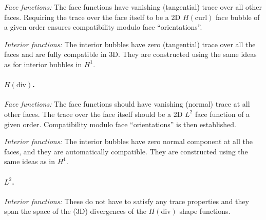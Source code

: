 \textit{Face functions:}
The face functions have vanishing (tangential) trace over all other faces.
Requiring the trace over the face itself to be a 2D $H(\mathrm{curl})$ face bubble of a given order ensures compatibility modulo face ``orientations''.

\textit{Interior functions:}
The interior bubbles have zero (tangential) trace over all the faces and are fully compatible in 3D.
They are constructed using the same ideas as for interior bubbles in $H^1$.

\paragraph{$H(\mathrm{div})$.}
\textit{Face functions:}
The face functions should have vanishing (normal) trace at all other faces.
The trace over the face itself should be a 2D $L^2$ face function of a given order.
Compatibility modulo face ``orientations'' is then established.

\textit{Interior functions:}
The interior bubbles have zero normal component at all the faces, and they are automatically compatible.
They are constructed using the same ideas as in $H^1$.

\paragraph{$L^2$.}
\textit{Interior functions:}
These do not have to satisfy any trace properties and they span the space of the (3D) divergences of the $H(\mathrm{div})$ shape functions.


